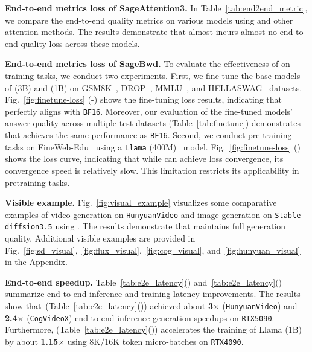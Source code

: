 \noindent\textbf{End-to-end metrics loss of SageAttention3.} In Table~\ref{tab:end2end_metric}, we compare the end-to-end quality metrics on various models using \our and other attention methods. The results demonstrate that \our almost incurs almost no end-to-end quality loss across these models.

\noindent\textbf{End-to-end metrics loss of SageBwd.} To evaluate the effectiveness of \sageback on training tasks, we conduct two experiments. First, we fine-tune the base models of \qwen(3B) and \llamal(1B) on GSM8K~\citep{cobbe2021gsm8k}, DROP~\citep{Dua2019DROP}, MMLU~\citep{MMLU}, and HELLASWAG~\citep{zellers2019hellaswag} datasets. Fig.~\ref{fig:finetune-loss} (-) shows the fine-tuning loss results, indicating that \sageback perfectly aligns with \texttt{BF16}. Moreover, our evaluation of the fine-tuned models' answer quality across multiple test datasets (Table~\ref{tab:finetune}) demonstrates that \sageback achieves the same performance as \texttt{BF16}. 
Second, we conduct pre-training tasks on FineWeb-Edu~\citep{lozhkov2024fineweb-edu} using a \texttt{Llama} (400M)~\citep{touvron2023llama} model. Fig.~\ref{fig:finetune-loss} () shows the loss curve, indicating that while \sageback can achieve loss convergence, its convergence speed is relatively slow. This limitation restricts its applicability in pretraining tasks.


\noindent\textbf{Visible example.} Fig.~\ref{fig:visual_example} visualizes some comparative examples of video generation on \texttt{HunyuanVideo} and image generation on \texttt{Stable-diffsion3.5} using \our. The results demonstrate that \our maintains full generation quality. Additional visible examples are provided in Fig.~\ref{fig:sd_visual},~\ref{fig:flux_visual},~\ref{fig:cog_visual}, and~\ref{fig:hunyuan_visual} in the Appendix.


\noindent\textbf{End-to-end speedup.}
Table~\ref{tab:e2e_latency}() and~\ref{tab:e2e_latency}() summarize end-to-end inference and training latency improvements. The results show that~\our (Table~\ref{tab:e2e_latency}()) achieved about \textbf{3}$\times$ (\texttt{HunyuanVideo}) and \textbf{2.4}$\times$ (\texttt{CogVideoX}) end-to-end inference generation speedups on \texttt{RTX5090}. Furthermore, \sageback (Table~\ref{tab:e2e_latency}()) accelerates the training of Llama (1B) by about \textbf{1.15}$\times$ using 8K/16K token micro-batches on \texttt{RTX4090}.



